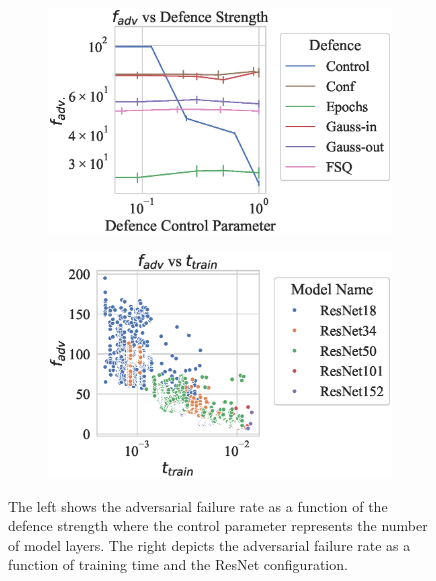 \begin{figure}[!h]
    \begin{subfigure}
        \centering
        \includegraphics[trim={0 10pt 0 10pt},clip,width=.48\textwidth]{cifar/def_param_vs_adv_failure_rate.eps}
    \end{subfigure}
    \begin{subfigure}
        \centering
        \includegraphics[trim={0 10pt 0 10pt},clip,width=.48\textwidth]{cifar/adv_failure_rate_vs_train_time.eps}
    \end{subfigure}
    \caption{The left shows the adversarial failure rate as a function of the defence strength where the control parameter represents the number of model layers. The right depicts the adversarial failure rate as a function of training time and the ResNet configuration.}
    \label{fig:cifar_failure_rate}
\end{figure}

